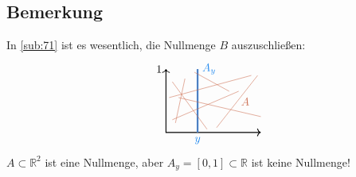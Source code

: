 \subsection[Bemerkung, warum $B$ in \ref{sub:71} ausgeschlossen werden muss]{Bemerkung} %
\label{sub:72}
In \ref{sub:71} ist es wesentlich, die Nullmenge $B$ auszuschließen:
\[
	\begin{tikzpicture}
		\draw[<->, thick] (0,2) node[left]{1} -- (0,0) -- (3,0);
		\draw[ultra thick, DodgerBlue2] (1,0)node[below]{$y$} -- (1,2) node[right]{$A_y$};
		\draw[Salmon3] (1,0) -- (1,2);
		\draw[Salmon3] (0.2,0.4) --(2.3,1.3);
		\draw[Salmon3] (0.6,1.7) --(0.3,0.3);
		\draw[Salmon3] (2,1.3) --(0.9,1.9);
		\draw[Salmon3] (3,0.5) --(0.4,1.1);
		\draw[Salmon3] (0.2,1.6) --(1.3,0.1);
		\draw[Salmon3] (0.1,1.1) --(2.7,1.8);
		\draw[Salmon3] (1.6,0.15) --(2.9,1.8) node[right, midway]{$A$};
	\end{tikzpicture}
\]
$A \subset \mathds{R}^2$ ist eine Nullmenge, aber $A_y = [0,1] \subset \mathds{R}$ ist keine Nullmenge!

